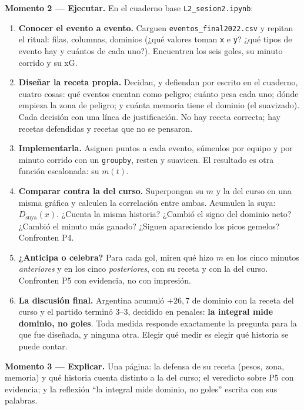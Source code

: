 \documentclass[12pt,letterpaper]{article}
\begin{document}
\textbf{Momento 2 --- Ejecutar.} En el cuaderno base \texttt{L2\_sesion2.ipynb}:

\begin{enumerate}[label=\arabic*.]
    \item \textbf{Conocer el evento a evento.} Carguen \texttt{eventos\_final2022.csv} y repitan el ritual: filas, columnas, dominios (¿qué valores toman \texttt{x} e \texttt{y}? ¿qué tipos de evento hay y cuántos de cada uno?). Encuentren los seis goles, su minuto corrido y su xG.
    \item \textbf{Diseñar la receta propia.} Decidan, y defiendan por escrito en el cuaderno, cuatro cosas: qué eventos cuentan como peligro; cuánto pesa cada uno; dónde empieza la zona de peligro; y cuánta memoria tiene el dominio (el suavizado). Cada decisión con una línea de justificación. No hay receta correcta; hay recetas defendidas y recetas que no se pensaron.
    \item \textbf{Implementarla.} Asignen puntos a cada evento, súmenlos por equipo y por minuto corrido con un \texttt{groupby}, resten y suavicen. El resultado es otra función escalonada: su $m(t)$.
    \item \textbf{Comparar contra la del curso.} Superpongan su $m$ y la del curso en una misma gráfica y calculen la correlación entre ambas. Acumulen la suya: $D_{\text{suya}}(x)$. ¿Cuenta la misma historia? ¿Cambió el signo del dominio neto? ¿Cambió el minuto más ganado? ¿Siguen apareciendo los picos gemelos? Confronten P4.
    \item \textbf{¿Anticipa o celebra?} Para cada gol, miren qué hizo $m$ en los cinco minutos \emph{anteriores} y en los cinco \emph{posteriores}, con su receta y con la del curso. Confronten P5 con evidencia, no con impresión.
    \item \textbf{La discusión final.} Argentina acumuló $+26{,}7$ de dominio con la receta del curso y el partido terminó 3--3, decidido en penales: \textbf{la integral mide dominio, no goles}. Toda medida responde exactamente la pregunta para la que fue diseñada, y ninguna otra. Elegir qué medir es elegir qué historia se puede contar.
\end{enumerate}

\textbf{Momento 3 --- Explicar.} Una página: la defensa de su receta (pesos, zona, memoria) y qué historia cuenta distinto a la del curso; el veredicto sobre P5 con evidencia; y la reflexión ``la integral mide dominio, no goles'' escrita con sus palabras.
\end{document}
